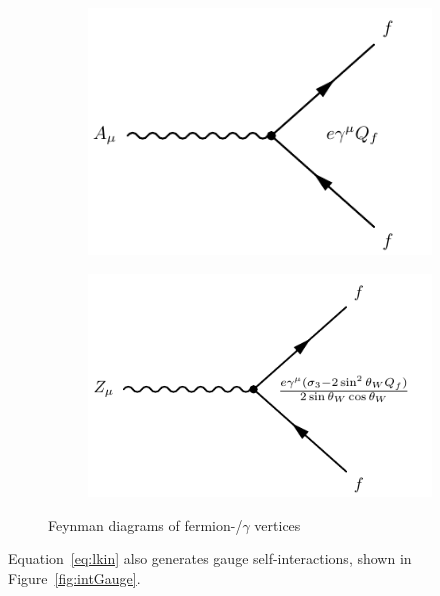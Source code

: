 \begin{figure}[!h]
\begin{subfigure}{0.5\textwidth}
   \includegraphics[width=\textwidth]{figures/photonFerm.pdf}
\end{subfigure} %
\begin{subfigure}{0.5\textwidth}
   \includegraphics[width=\textwidth]{figures/zFerm.pdf}
\end{subfigure}
\caption{Feynman diagrams of fermion-\Zboson/$\gamma$ vertices}
\label{fig:neutBosFerm}
\end{figure}

Equation~\ref{eq:lkin} also generates gauge self-interactions, shown in Figure~\ref{fig:intGauge}. 

